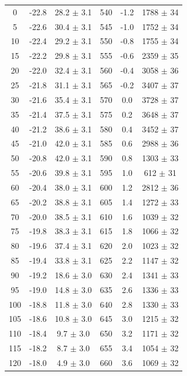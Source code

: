 \documentclass[a4paper,12pt]{article}
\begin{document}
\begin{center}
\begin{longtable}{|c|c|c||c|c|c|}
0 & -22.8 & 28.2 $\pm$  3.1   & 540 & -1.2 & 1788 $\pm$  34  \\
5 & -22.6 & 30.4 $\pm$  3.1   & 545 & -1.0 & 1752 $\pm$  34  \\
10 & -22.4 & 29.2 $\pm$  3.1   & 550 & -0.8 & 1755 $\pm$  34  \\
15 & -22.2 & 29.8 $\pm$  3.1   & 555 & -0.6 & 2359 $\pm$  35  \\
20 & -22.0 & 32.4 $\pm$  3.1   & 560 & -0.4 & 3058 $\pm$  36  \\
25 & -21.8 & 31.1 $\pm$  3.1   & 565 & -0.2 & 3407 $\pm$  37  \\
30 & -21.6 & 35.4 $\pm$  3.1   & 570 & 0.0 & 3728 $\pm$  37  \\
35 & -21.4 & 37.5 $\pm$  3.1   & 575 & 0.2 & 3648 $\pm$  37  \\
40 & -21.2 & 38.6 $\pm$  3.1   & 580 & 0.4 & 3452 $\pm$  37  \\
45 & -21.0 & 42.0 $\pm$  3.1   & 585 & 0.6 & 2988 $\pm$  36  \\
50 & -20.8 & 42.0 $\pm$  3.1   & 590 & 0.8 & 1303 $\pm$  33  \\
55 & -20.6 & 39.8 $\pm$  3.1   & 595 & 1.0 & 612 $\pm$  31  \\
60 & -20.4 & 38.0 $\pm$  3.1   & 600 & 1.2 & 2812 $\pm$  36  \\
65 & -20.2 & 38.8 $\pm$  3.1   & 605 & 1.4 & 1272 $\pm$  33  \\
70 & -20.0 & 38.5 $\pm$  3.1   & 610 & 1.6 & 1039 $\pm$  32  \\
75 & -19.8 & 38.3 $\pm$  3.1   & 615 & 1.8 & 1066 $\pm$  32  \\
80 & -19.6 & 37.4 $\pm$  3.1   & 620 & 2.0 & 1023 $\pm$  32  \\
85 & -19.4 & 33.8 $\pm$  3.1   & 625 & 2.2 & 1147 $\pm$  32  \\
90 & -19.2 & 18.6 $\pm$  3.0   & 630 & 2.4 & 1341 $\pm$  33  \\
95 & -19.0 & 14.8 $\pm$  3.0   & 635 & 2.6 & 1336 $\pm$  33  \\
100 & -18.8 & 11.8 $\pm$  3.0   & 640 & 2.8 & 1330 $\pm$  33  \\
105 & -18.6 & 10.8 $\pm$  3.0   & 645 & 3.0 & 1215 $\pm$  32  \\
110 & -18.4 & 9.7 $\pm$  3.0   & 650 & 3.2 & 1171 $\pm$  32  \\
115 & -18.2 & 8.7 $\pm$  3.0   & 655 & 3.4 & 1054 $\pm$  32  \\
120 & -18.0 & 4.9 $\pm$  3.0   & 660 & 3.6 & 1069 $\pm$  32  \\

\end{longtable}
\end{center}
\end{document}
